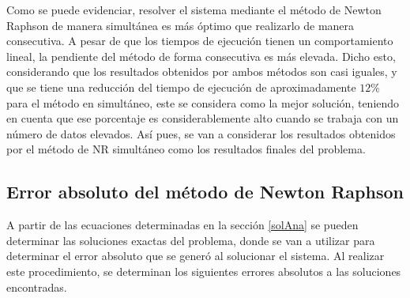 \documentclass[12pt]{article}
\begin{document}
Como se puede evidenciar, resolver el sistema mediante el método de Newton Raphson de manera simultánea es más óptimo que realizarlo de manera consecutiva. A pesar de que los tiempos de ejecución tienen un comportamiento lineal, la pendiente del método de forma consecutiva es más elevada. Dicho esto, considerando que los resultados obtenidos por ambos métodos son casi iguales, y que se tiene una reducción del tiempo de ejecución de aproximadamente $12\%$ para el método en simultáneo, este se considera como la mejor solución, teniendo en cuenta que ese porcentaje es considerablemente alto cuando se trabaja con un número de datos elevados. Así pues, se van a considerar los resultados obtenidos por el método de NR simultáneo como los resultados finales del problema. 
\subsection{Error absoluto del método de Newton Raphson}
A partir de las ecuaciones determinadas en la sección \ref{solAna} se pueden determinar las soluciones exactas del problema, donde se van a utilizar para determinar el error absoluto que se generó al solucionar el sistema. Al realizar este procedimiento, se determinan los siguientes errores absolutos a las soluciones encontradas.
\end{document}
